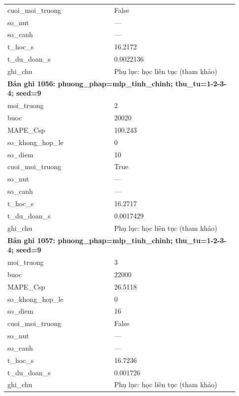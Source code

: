 \begin{longtable}{p{0.43\linewidth}p{0.50\linewidth}}
cuoi\_\allowbreak moi\_\allowbreak truong & False \\
so\_\allowbreak nut & — \\
so\_\allowbreak canh & — \\
t\_\allowbreak hoc\_\allowbreak s & 16.2172 \\
t\_\allowbreak du\_\allowbreak doan\_\allowbreak s & 0.0022136 \\
ghi\_\allowbreak chu & Phụ lục: học liên tục (tham khảo) \\
\midrule
\multicolumn{2}{p{0.95\linewidth}}{\textbf{Bản ghi 1056: phuong\_phap=mlp\_tinh\_chinh; thu\_tu=1-2-3-4; seed=9}} \\
moi\_\allowbreak truong & 2 \\
buoc & 20020 \\
MAPE\_\allowbreak Csp & 100.243 \\
so\_\allowbreak khong\_\allowbreak hop\_\allowbreak le & 0 \\
so\_\allowbreak diem & 10 \\
cuoi\_\allowbreak moi\_\allowbreak truong & True \\
so\_\allowbreak nut & — \\
so\_\allowbreak canh & — \\
t\_\allowbreak hoc\_\allowbreak s & 16.2717 \\
t\_\allowbreak du\_\allowbreak doan\_\allowbreak s & 0.0017429 \\
ghi\_\allowbreak chu & Phụ lục: học liên tục (tham khảo) \\
\midrule
\multicolumn{2}{p{0.95\linewidth}}{\textbf{Bản ghi 1057: phuong\_phap=mlp\_tinh\_chinh; thu\_tu=1-2-3-4; seed=9}} \\
moi\_\allowbreak truong & 3 \\
buoc & 22000 \\
MAPE\_\allowbreak Csp & 26.5118 \\
so\_\allowbreak khong\_\allowbreak hop\_\allowbreak le & 0 \\
so\_\allowbreak diem & 16 \\
cuoi\_\allowbreak moi\_\allowbreak truong & False \\
so\_\allowbreak nut & — \\
so\_\allowbreak canh & — \\
t\_\allowbreak hoc\_\allowbreak s & 16.7236 \\
t\_\allowbreak du\_\allowbreak doan\_\allowbreak s & 0.001726 \\
ghi\_\allowbreak chu & Phụ lục: học liên tục (tham khảo) \\

\end{longtable}
